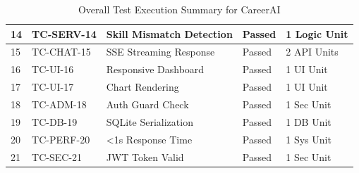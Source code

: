 \begin{table}[H]
\begin{center}
\begin{tabular}{| m{1cm} | m{1.5cm} | m{7em}| m{4em}| m{5em} |}
 \hline
 14 & TC-SERV-14 & Skill Mismatch Detection & Passed & 1 Logic Unit \\
 \hline
 15 & TC-CHAT-15 & SSE Streaming Response & Passed & 2 API Units \\
 \hline
 16 & TC-UI-16 & Responsive Dashboard & Passed & 1 UI Unit \\
 \hline
 17 & TC-UI-17 & Chart Rendering & Passed & 1 UI Unit \\
 \hline
 18 & TC-ADM-18 & Auth Guard Check & Passed & 1 Sec Unit \\
 \hline
 19 & TC-DB-19 & SQLite Serialization & Passed & 1 DB Unit \\
 \hline
 20 & TC-PERF-20 & <1s Response Time & Passed & 1 Sys Unit \\
 \hline
 21 & TC-SEC-21 & JWT Token Valid & Passed & 1 Sec Unit \\
 \hline
\end{tabular}
\caption{Overall Test Execution Summary for CareerAI}
\end{center}
\end{table}
